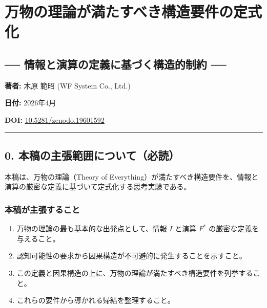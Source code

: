 \documentclass[a4paper,11pt]{ltjsarticle}
\providecommand{\tightlist}{\setlength{\itemsep}{0pt}\setlength{\parskip}{0pt}}
\begin{document}
\section{万物の理論が満たすべき構造要件の定式化}\label{ux4e07ux7269ux306eux7406ux8ad6ux304cux6e80ux305fux3059ux3079ux304dux69cbux9020ux8981ux4ef6ux306eux5b9aux5f0fux5316}

\subsection{── 情報と演算の定義に基づく構造的制約
──}\label{ux60c5ux5831ux3068ux6f14ux7b97ux306eux5b9aux7fa9ux306bux57faux3065ux304fux69cbux9020ux7684ux5236ux7d04}

\textbf{著者:} 木原 範昭 (WF System Co., Ltd.)

\textbf{日付:} 2026年4月

\textbf{DOI:}
\href{https://doi.org/10.5281/zenodo.19601592}{10.5281/zenodo.19601592}

\begin{center}\rule{0.5\linewidth}{0.5pt}\end{center}

\subsection{0.
本稿の主張範囲について（必読）}\label{ux672cux7a3fux306eux4e3bux5f35ux7bc4ux56f2ux306bux3064ux3044ux3066ux5fc5ux8aad}

本稿は、万物の理論（Theory of
Everything）が満たすべき構造要件を、情報と演算の厳密な定義に基づいて定式化する思考実験である。

\subsubsection{本稿が主張すること}\label{ux672cux7a3fux304cux4e3bux5f35ux3059ux308bux3053ux3068}

\begin{enumerate}
\def\labelenumi{\arabic{enumi}.}
\tightlist
\item
  万物の理論の最も基本的な出発点として、情報 \(I\) と演算 \(F^*\)
  の厳密な定義を与えること。
\item
  認知可能性の要求から因果構造が不可避的に発生することを示すこと。
\item
  この定義と因果構造の上に、万物の理論が満たすべき構造要件を列挙すること。
\item
  これらの要件から導かれる帰結を整理すること。
\end{enumerate}
\end{document}
